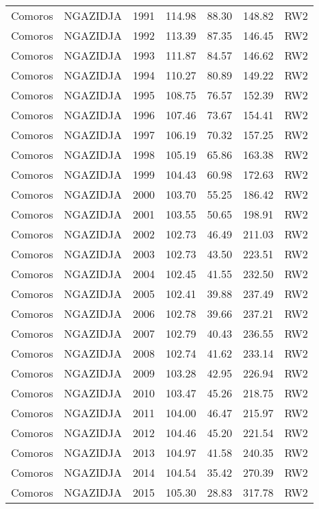 \begin{longtable}{lllrrrl}
  Comoros & NGAZIDJA & 1991 & 114.98 & 88.30 & 148.82 & RW2 \\ 
  Comoros & NGAZIDJA & 1992 & 113.39 & 87.35 & 146.45 & RW2 \\ 
  Comoros & NGAZIDJA & 1993 & 111.87 & 84.57 & 146.62 & RW2 \\ 
  Comoros & NGAZIDJA & 1994 & 110.27 & 80.89 & 149.22 & RW2 \\ 
  Comoros & NGAZIDJA & 1995 & 108.75 & 76.57 & 152.39 & RW2 \\ 
  Comoros & NGAZIDJA & 1996 & 107.46 & 73.67 & 154.41 & RW2 \\ 
  Comoros & NGAZIDJA & 1997 & 106.19 & 70.32 & 157.25 & RW2 \\ 
  Comoros & NGAZIDJA & 1998 & 105.19 & 65.86 & 163.38 & RW2 \\ 
  Comoros & NGAZIDJA & 1999 & 104.43 & 60.98 & 172.63 & RW2 \\ 
  Comoros & NGAZIDJA & 2000 & 103.70 & 55.25 & 186.42 & RW2 \\ 
  Comoros & NGAZIDJA & 2001 & 103.55 & 50.65 & 198.91 & RW2 \\ 
  Comoros & NGAZIDJA & 2002 & 102.73 & 46.49 & 211.03 & RW2 \\ 
  Comoros & NGAZIDJA & 2003 & 102.73 & 43.50 & 223.51 & RW2 \\ 
  Comoros & NGAZIDJA & 2004 & 102.45 & 41.55 & 232.50 & RW2 \\ 
  Comoros & NGAZIDJA & 2005 & 102.41 & 39.88 & 237.49 & RW2 \\ 
  Comoros & NGAZIDJA & 2006 & 102.78 & 39.66 & 237.21 & RW2 \\ 
  Comoros & NGAZIDJA & 2007 & 102.79 & 40.43 & 236.55 & RW2 \\ 
  Comoros & NGAZIDJA & 2008 & 102.74 & 41.62 & 233.14 & RW2 \\ 
  Comoros & NGAZIDJA & 2009 & 103.28 & 42.95 & 226.94 & RW2 \\ 
  Comoros & NGAZIDJA & 2010 & 103.47 & 45.26 & 218.75 & RW2 \\ 
  Comoros & NGAZIDJA & 2011 & 104.00 & 46.47 & 215.97 & RW2 \\ 
  Comoros & NGAZIDJA & 2012 & 104.46 & 45.20 & 221.54 & RW2 \\ 
  Comoros & NGAZIDJA & 2013 & 104.97 & 41.58 & 240.35 & RW2 \\ 
  Comoros & NGAZIDJA & 2014 & 104.54 & 35.42 & 270.39 & RW2 \\ 
  Comoros & NGAZIDJA & 2015 & 105.30 & 28.83 & 317.78 & RW2 \\ 

\end{longtable}
